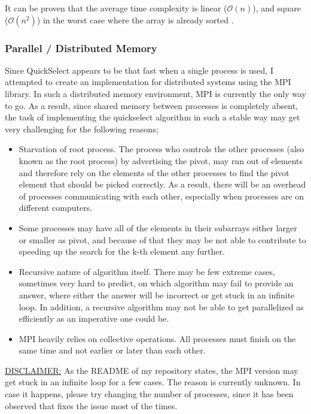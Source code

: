 \documentclass[11pt]{article}
\begin{document}
It can be proven that the average time complexity is linear (\(\mathcal{O}(n)\)), and square (\(\mathcal{O}(n^{2})\)) in the worst case where the array is already sorted \autocite{quickselect}.
\subsubsection{Parallel / Distributed Memory}
\label{sec:orgced3155}
Since QuickSelect appears to be that fast when a single process is used, I attempted to create an implementation for distributed systems using the MPI library. In such a distributed memory environment, MPI is currently the only way to go. As a result, since shared memory between processes is completely absent, the task of implementing the quickselect algorithm in such a stable way may get very challenging for the following reasons;
\begin{itemize}
\item Starvation of root process. The process who controls the other processes (also known as the root process) by advertising the pivot, may run out of elements and therefore rely on the elements of the other processes to find the pivot element that should be picked correctly. As a result, there will be an overhead of processes communicating with each other, especially when processes are on different computers.
\item Some processes may have all of the elements in their subarrays either larger or smaller as pivot, and because of that they may be not able to contribute to speeding up the search for the k-th element any further.
\item Recursive nature of algorithm itself. There may be few extreme cases, sometimes very hard to predict, on which algorithm may fail to provide an answer, where either the answer will be incorrect or get stuck in an infinite loop. In addition, a recursive algorithm may not be able to get parallelized as efficiently as an imperative one could be.
\item MPI heavily relies on collective operations. All processes must finish on the same time and not earlier or later than each other. \autocite{mpi-forum}
\end{itemize}
\uline{DISCLAIMER:} As the README of my repository states, the MPI version may get stuck in an infinite loop for a few cases. The reason is currently unknown. In case it happens, please try changing the number of processes, since it has been observed that fixes the issue most of the times.
\end{document}
